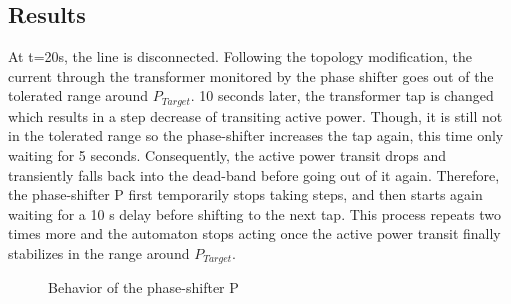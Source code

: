 \documentclass[a4paper, 12pt]{report}
\begin{document}
\newpage
\subsection{Results}

At t=20s, the line is disconnected. Following the topology modification, the current through the transformer monitored by the phase shifter goes out of the tolerated range around $P_{Target}$.  10 seconds later, the transformer tap is changed which results in a step decrease of transiting active power. Though, it is still not in the tolerated range so the phase-shifter increases the tap again, this time only waiting for 5 seconds. Consequently, the active power transit drops and transiently falls back into the dead-band before going out of it again. Therefore, the phase-shifter P first temporarily stops taking steps, and then starts again waiting for a 10 s delay before shifting to the next tap. This process repeats two times more and the automaton stops acting once the active power transit finally stabilizes in the range around $P_{Target}$. \\

\begin{figure}[H]
\caption{Behavior of the phase-shifter P}
\end{figure}
\end{document}
